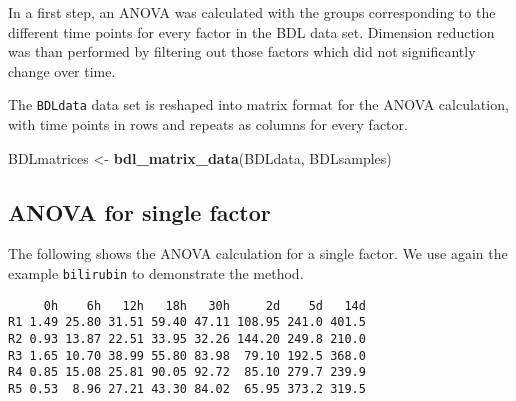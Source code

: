 \documentclass[]{article}
\newenvironment{Shaded}{\begin{snugshade}}{\end{snugshade}}
\newcommand{\KeywordTok}[1]{\textcolor[rgb]{0.13,0.29,0.53}{\textbf{{#1}}}}
\newcommand{\StringTok}[1]{\textcolor[rgb]{0.31,0.60,0.02}{{#1}}}
\newcommand{\CommentTok}[1]{\textcolor[rgb]{0.56,0.35,0.01}{\textit{{#1}}}}
\newcommand{\NormalTok}[1]{{#1}}
\begin{document}
In a first step, an ANOVA was calculated with the groups corresponding
to the different time points for every factor in the BDL data set.
Dimension reduction was than performed by filtering out those factors
which did not significantly change over time.

The \texttt{BDLdata} data set is reshaped into matrix format for the
ANOVA calculation, with time points in rows and repeats as columns for
every factor.

\begin{Shaded}
\begin{Highlighting}[]
\NormalTok{BDLmatrices <-}\StringTok{ }\KeywordTok{bdl_matrix_data}\NormalTok{(BDLdata, BDLsamples)}
\end{Highlighting}
\end{Shaded}

\subsection{ANOVA for single factor}\label{anova-for-single-factor}

The following shows the ANOVA calculation for a single factor. We use
again the example \texttt{bilirubin} to demonstrate the method.

\begin{Shaded}
\end{Shaded}

\begin{verbatim}
     0h    6h   12h   18h   30h     2d    5d   14d
R1 1.49 25.80 31.51 59.40 47.11 108.95 241.0 401.5
R2 0.93 13.87 22.51 33.95 32.26 144.20 249.8 210.0
R3 1.65 10.70 38.99 55.80 83.98  79.10 192.5 368.0
R4 0.85 15.08 25.81 90.05 92.72  85.10 279.7 239.9
R5 0.53  8.96 27.21 43.30 84.02  65.95 373.2 319.5
\end{verbatim}
\end{document}
